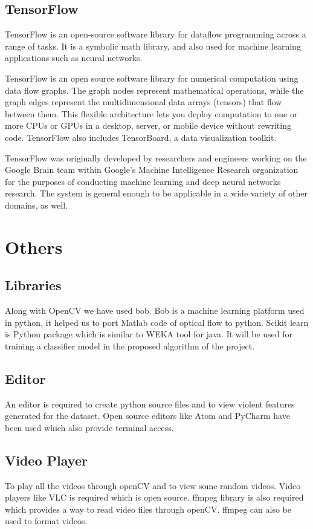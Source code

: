 \subsection{TensorFlow}
TensorFlow is an open-source software library for dataflow programming across a range of tasks. It is a symbolic math library, and also used for machine learning applications such as neural networks.
\par
TensorFlow is an open source software library for numerical computation using data flow graphs. The graph nodes represent mathematical operations, while the graph edges represent the multidimensional data arrays (tensors) that flow between them. This flexible architecture lets you deploy computation to one or more CPUs or GPUs in a desktop, server, or mobile device without rewriting code. TensorFlow also includes TensorBoard, a data visualization toolkit.
\par
TensorFlow was originally developed by researchers and engineers working on the Google Brain team within Google's Machine Intelligence Research organization for the purposes of conducting machine learning and deep neural networks research. The system is general enough to be applicable in a wide variety of other domains, as well.
\section{Others}
\subsection{Libraries}
Along with OpenCV we have used bob. Bob is a machine learning platform used in python, it helped us to port Matlab code of optical flow to python. Scikit learn is Python package which is similar to WEKA tool for java. It will be used for training a classifier model in the proposed algorithm of the project.

\subsection{Editor}
An editor is required to create python source files and to view violent features generated for the dataset. Open source editors like Atom and PyCharm have been used which also provide terminal access.

\subsection{Video Player}
To play all the videos through openCV and to view some random videos. Video players like VLC is required which is open source. ffmpeg library is also required which provides a way to read video files through openCV. ffmpeg can also be used to format videos.
